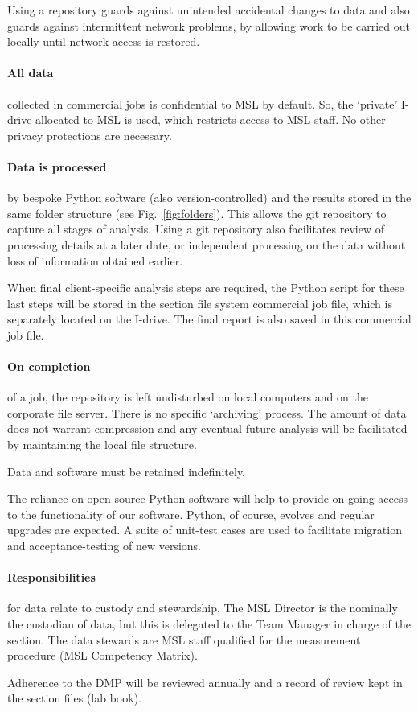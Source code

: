 Using a repository guards against unintended accidental changes to data and also guards against intermittent network problems, by allowing work to be carried out locally until network access is restored.

\paragraph{All data} collected in commercial jobs is confidential to MSL by default. So, the `private' I-drive allocated to MSL is used, which restricts access to MSL staff. No other privacy protections are necessary.  

\paragraph{Data is processed} by bespoke Python software (also version-controlled) and the results stored in the same folder structure (see Fig.~\ref{fig:folders}). This allows the git repository to capture all stages of analysis. Using a git repository also facilitates review of processing details at a later date, or independent processing on the data without loss of information obtained earlier. 

When final client-specific analysis steps are required, the Python script for these last steps will be stored in the section file system commercial job file, which is separately located on the I-drive. The final report is also saved in this commercial job file. 

\paragraph{On completion} of a job, the repository is left undisturbed on local computers and on the corporate file server. There is no specific `archiving' process. The amount of data does not warrant compression and any eventual future analysis will be facilitated by maintaining the local file structure. 

Data and software must be retained indefinitely. 

The reliance on open-source Python software will help to provide on-going access to the functionality of our software. Python, of course, evolves and regular upgrades are expected. A suite of unit-test cases are used to facilitate migration and acceptance-testing of new versions.

\paragraph{Responsibilities} for data relate to custody and stewardship. The MSL Director is the nominally the custodian of data, but this is delegated to the Team Manager in charge of the section. The data stewards are MSL staff  qualified for the measurement procedure (MSL Competency Matrix). 

Adherence to the DMP will be reviewed annually and a record of review kept in the section files (lab book). 
